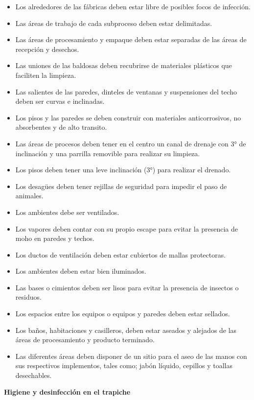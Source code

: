 \documentclass{article}%
\begin{document}
\begin{large}
\begin{itemize}
\begin{itemize}
\item%
Los alrededores de las fábricas deben estar libre de posibles focos de infección.%
\item%
Las áreas de trabajo de cada subproceso deben estar delimitadas.%
\item%
Las áreas de procesamiento y empaque deben estar separadas de las áreas de recepción y desechos.%
\item%
Las uniones de las baldosas deben recubrirse de materiales plásticos que faciliten la limpieza.%
\item%
Las salientes de las paredes, dinteles de ventanas y suspensiones del techo deben ser curvas e inclinadas.%
\item%
Los pisos y las paredes se deben construir con materiales anticorrosivos, no absorbentes y de alto transito.%
\item%
Las áreas de procesos deben tener en el centro un canal de drenaje con 3° de inclinación y una parrilla removible para realizar su limpieza.%
\item%
Los pisos deben tener una leve inclinación (3°) para realizar el drenado.%
\item%
Los desagües deben tener rejillas de seguridad para impedir el paso de animales.%
\item%
Los ambientes debe ser ventilados.%
\item%
Los vapores deben contar con su propio escape para evitar la presencia de moho en paredes y techos.%
\item%
Los ductos de ventilación deben estar cubiertos de mallas protectoras.%
\item%
Los ambientes deben estar bien iluminados.%
\item%
Las bases o cimientos deben ser lisos para evitar la presencia de insectos o residuos.%
\item%
Los espacios entre los equipos o equipos y paredes deben estar sellados.%
\item%
Los baños, habitaciones y casilleros, deben estar aseados y alejados de las áreas de procesamiento y producto terminado.%
\item%
Las diferentes áreas deben disponer de un sitio para el aseo de las manos con sus respectivos implementos, tales como; jabón líquido, cepillos y toallas desechables.%
\end{itemize}%
\end{itemize}%
\begin{Large}%
\textbf{Higiene y desinfección en el trapiche}%
\end{Large}%

\end{large}
\end{document}
